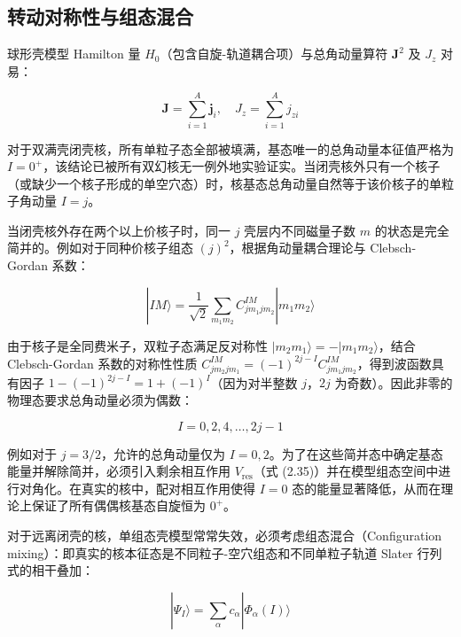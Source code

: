 \subsection{转动对称性与组态混合}

球形壳模型 Hamilton 量 $H_{0}$（包含自旋-轨道耦合项）与总角动量算符 $\boldsymbol{J}^{2}$
及 $J_{z}$ 对易：

\begin{equation}
\boldsymbol{J}=\sum^{A}_{i=1}\boldsymbol{j}_{i},\quad J_{z}=\sum^{A}_{i=1}j_{zi}\label{eq:total_J_def}
\end{equation}

对于双满壳闭壳核，所有单粒子态全部被填满，基态唯一的总角动量本征值严格为 $I=0^{+}$，该结论已被所有双幻核无一例外地实验证实。当闭壳核外只有一个核子（或缺少一个核子形成的单空穴态）时，核基态总角动量自然等于该价核子的单粒子角动量
$I=j$。

当闭壳核外存在两个以上价核子时，同一 $j$ 壳层内不同磁量子数 $m$ 的状态是完全简并的。例如对于同种价核子组态 $(j)^{2}$，根据角动量耦合理论与
Clebsch-Gordan 系数：

\begin{equation}
|IM\rangle=\frac{1}{\sqrt{2}}\sum_{m_{1}m_{2}}C^{IM}_{jm_{1}jm_{2}}|m_{1}m_{2}\rangle\label{eq:cg_two_particle_coupling}
\end{equation}

由于核子是全同费米子，双粒子态满足反对称性 $|m_{2}m_{1}\rangle=-|m_{1}m_{2}\rangle$，结合
Clebsch-Gordan 系数的对称性性质 $C^{IM}_{jm_{2}jm_{1}}=(-1)^{2j-I}C^{IM}_{jm_{1}jm_{2}}$，得到波函数具有因子
$1-(-1)^{2j-I}=1+(-1)^{I}$（因为对半整数 $j$，$2j$ 为奇数）。因此非零的物理态要求总角动量必须为偶数：

\begin{equation}
I=0,2,4,\dots,2j-1\label{eq:even_I_allowed}
\end{equation}

例如对于 $j=3/2$，允许的总角动量仅为 $I=0,2$。为了在这些简并态中确定基态能量并解除简并，必须引入剩余相互作用 $V_{\text{res}}$（式
(2.35)）并在模型组态空间中进行对角化。在真实的核中，配对相互作用使得 $I=0$ 态的能量显著降低，从而在理论上保证了所有偶偶核基态自旋恒为
$0^{+}$。

对于远离闭壳的核，单组态壳模型常常失效，必须考虑组态混合（Configuration mixing）：即真实的核本征态是不同粒子-空穴组态和不同单粒子轨道
Slater 行列式的相干叠加：

\begin{equation}
|\Psi_{I}\rangle=\sum_{\alpha}c_{\alpha}|\Phi_{\alpha}(I)\rangle\label{eq:config_mixing_wavefunction}
\end{equation}

